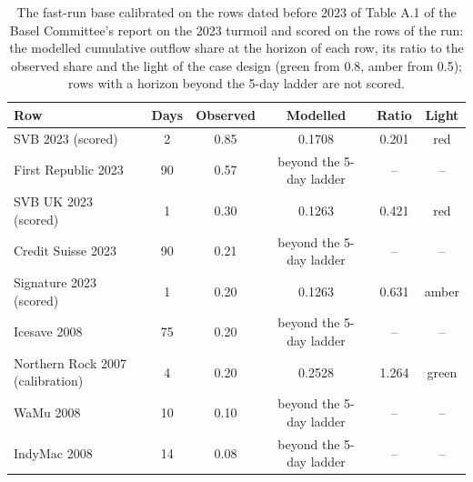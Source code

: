 \begin{table}[htbp]
\centering
\small
\setlength{\tabcolsep}{3pt}
\caption{The fast-run base calibrated on the rows dated before 2023 of Table A.1 of the Basel Committee's report on the 2023 turmoil \citep{bcbs555} and scored on the rows of the run: the modelled cumulative outflow share at the horizon of each row, its ratio to the observed share and the light of the case design (green from 0.8, amber from 0.5); rows with a horizon beyond the 5-day ladder are not scored.}
\label{tab:labelled-run}
\begin{tabular}{lccccc}
\toprule
Row & Days & Observed & Modelled & Ratio & Light \\
\midrule
SVB 2023 (scored) & 2 & 0.85 & 0.1708 & 0.201 & red \\
First Republic 2023 & 90 & 0.57 & beyond the 5-day ladder & -- & -- \\
SVB UK 2023 (scored) & 1 & 0.30 & 0.1263 & 0.421 & red \\
Credit Suisse 2023 & 90 & 0.21 & beyond the 5-day ladder & -- & -- \\
Signature 2023 (scored) & 1 & 0.20 & 0.1263 & 0.631 & amber \\
Icesave 2008 & 75 & 0.20 & beyond the 5-day ladder & -- & -- \\
Northern Rock 2007 (calibration) & 4 & 0.20 & 0.2528 & 1.264 & green \\
WaMu 2008 & 10 & 0.10 & beyond the 5-day ladder & -- & -- \\
IndyMac 2008 & 14 & 0.08 & beyond the 5-day ladder & -- & -- \\
\bottomrule
\end{tabular}
\end{table}
